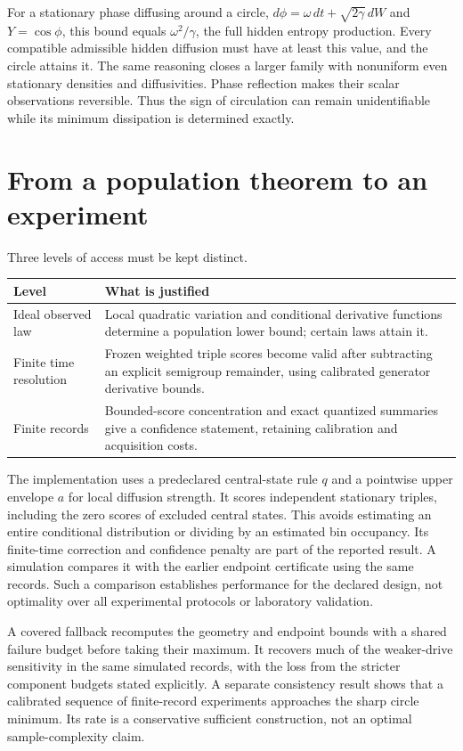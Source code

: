 For a stationary phase diffusing around a circle,
$d\phi=\omega\,dt+\sqrt{2\gamma}\,dW$ and $Y=\cos\phi$, this bound equals
$\omega^2/\gamma$, the full hidden entropy production. Every compatible
admissible hidden diffusion must have at least this value, and the circle
attains it. The same reasoning closes a larger family with nonuniform even
stationary densities and diffusivities. Phase reflection makes their scalar
observations reversible. Thus the sign of circulation can remain unidentifiable
while its minimum dissipation is determined exactly.

\section{From a population theorem to an experiment}
Three levels of access must be kept distinct.
\begin{center}
\begin{tabular}{p{}p{}}
\toprule
Level & What is justified\\
\midrule
Ideal observed law & Local quadratic variation and conditional derivative
functions determine a population lower bound; certain laws attain it.\\
Finite time resolution & Frozen weighted triple scores become valid after
subtracting an explicit semigroup remainder, using calibrated generator
derivative bounds.\\
Finite records & Bounded-score concentration and exact quantized summaries
give a confidence statement, retaining calibration and acquisition costs.\\
\bottomrule
\end{tabular}
\end{center}

The implementation uses a predeclared central-state rule $q$ and a pointwise
upper envelope $a$ for local diffusion strength. It scores independent
stationary triples, including the zero scores of excluded central states.
This avoids estimating an entire conditional distribution or dividing by an
estimated bin occupancy. Its finite-time correction and confidence penalty
are part of the reported result. A simulation compares it with the earlier
endpoint certificate using the same records. Such a comparison establishes
performance for the declared design, not optimality over all experimental
protocols or laboratory validation.

A covered fallback recomputes the geometry and endpoint bounds with a shared
failure budget before taking their maximum. It recovers much of the weaker-drive
sensitivity in the same simulated records, with the loss from the stricter
component budgets stated explicitly. A separate consistency result shows that
a calibrated sequence of finite-record experiments approaches the sharp circle
minimum. Its rate is a conservative sufficient construction, not an optimal
sample-complexity claim.

